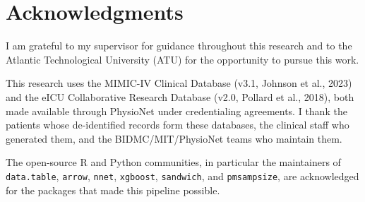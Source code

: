 \chapter*{Acknowledgments}

I am grateful to my supervisor for guidance throughout this research and to the
Atlantic Technological University (ATU) for the opportunity to pursue this work.

This research uses the MIMIC-IV Clinical Database
(v3.1, Johnson et al., 2023) and the eICU Collaborative Research Database
(v2.0, Pollard et al., 2018), both made available through PhysioNet under
credentialing agreements. I thank the patients whose de-identified records form
these databases, the clinical staff who generated them, and the BIDMC/MIT/PhysioNet
teams who maintain them.

The open-source R and Python communities, in particular the maintainers of
\texttt{data.table}, \texttt{arrow}, \texttt{nnet}, \texttt{xgboost},
\texttt{sandwich}, and \texttt{pmsampsize}, are acknowledged for the packages
that made this pipeline possible.
